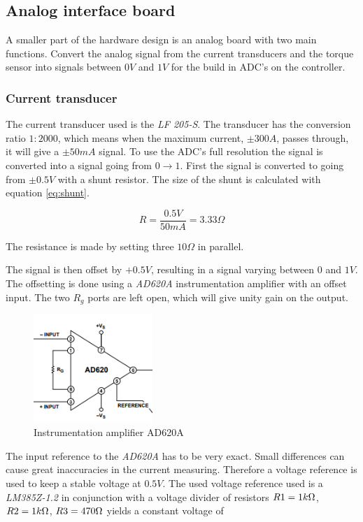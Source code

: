 \subsection{Analog interface board}
A smaller part of the hardware design is an analog board with two main functions. Convert the analog signal from the current transducers and the torque sensor into signals between $0V$ and $1V$ for the build in ADC's on the controller.

\subsubsection{Current transducer}
The current transducer used is the \textit{LF 205-S}. The transducer has the conversion ratio $1:2000$, which means when the maximum current, $\pm 300A$, passes through, it will give a $\pm 50mA$ signal. To use the ADC's full resolution the signal is converted into a signal going from $0\rightarrow 1$. First the signal is converted to going from $\pm 0.5V$ with a shunt resistor. The size of the shunt is calculated with equation \ref{eq:shunt}.

\begin{equation}
	R = \frac{0.5V}{50mA} = 3.33\Omega
	\label{eq:shunt}
\end{equation}

The resistance is made by setting three $10 \Omega$ in parallel.

The signal is then offset by $+0.5V$, resulting in a signal varying between $0$ and $1V$. The offsetting is done using a \textit{AD620A} instrumentation amplifier with an offset input. The two $R_g$ ports are left open, which will give unity gain on the output.

\begin{figure}[H]
	\centering
	\includegraphics[width=0.4\textwidth]{pictures/hardware/Analog_Interface_board/AD620A.PNG}
	\caption{Instrumentation amplifier AD620A}
	\label{fig:AD620A}
\end{figure} 

The input reference to the \textit{AD620A} has to be very exact. Small differences can cause great inaccuracies in the current measuring. Therefore a voltage reference is used to keep a stable voltage at $0.5V$. The used voltage reference used is a \textit{LM385Z-1.2} in conjunction with a voltage divider of resistors $R1 = 1k\ohm$, $R2 = 1k\ohm$, $R3 = 470\ohm$ yields a constant voltage of

